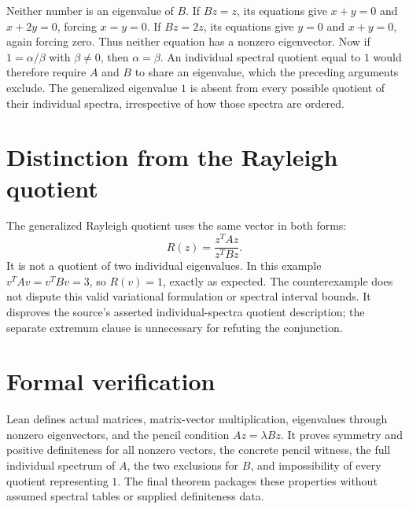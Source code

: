 \documentclass[10pt,a4paper]{article}
\begin{document}
Neither number is an eigenvalue of $B$. If $Bz=z$, its equations give
$x+y=0$ and $x+2y=0$, forcing $x=y=0$.
If $Bz=2z$, its equations give $y=0$ and $x+y=0$, again forcing zero.
Thus neither equation has a nonzero eigenvector.
Now if $1=\alpha/\beta$ with $\beta\ne0$, then $\alpha=\beta$.
An individual spectral quotient equal to $1$ would therefore require
$A$ and $B$ to share an eigenvalue, which the preceding arguments exclude.
The generalized eigenvalue $1$ is absent from every possible quotient
of their individual spectra, irrespective of how those spectra are ordered.

\section*{Distinction from the Rayleigh quotient}
The generalized Rayleigh quotient uses the same vector in both forms:
\[
R(z)=\frac{z^TAz}{z^TBz}.
\]
It is not a quotient of two individual eigenvalues. In this example
$v^TAv=v^TBv=3$, so $R(v)=1$, exactly as expected.
The counterexample does not dispute this valid variational formulation
or spectral interval bounds. It disproves the source's asserted
individual-spectra quotient description; the separate extremum clause
is unnecessary for refuting the conjunction.

\section*{Formal verification}
Lean defines actual matrices, matrix-vector multiplication, eigenvalues
through nonzero eigenvectors, and the pencil condition $Az=\lambda Bz$.
It proves symmetry and positive definiteness for all nonzero vectors,
the concrete pencil witness, the full individual spectrum of $A$,
the two exclusions for $B$, and impossibility of every quotient
representing $1$. The final theorem packages these properties
without assumed spectral tables or supplied definiteness data.
\end{document}
